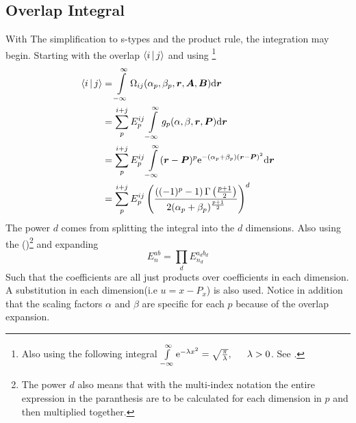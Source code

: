 \subsection{Overlap Integral\label{susec:overlapIntegral}}
    With The simplification to s-types and the product rule, the integration
    may begin. Starting with the overlap $\Braket{i|j}$ and using
    \footnote{Also using the following integral $\infint
    \me^{-\lambda x^2} = \sqrt{\frac{\pi}{\lambda}},\indent \lambda>0$. See
    \cite{handbookmath}.}
        \begin{align}
            \Braket{i|j} &= \int\limits^{\infty}_{-\infty}
            \Omega_{ij}(\alpha_p,\beta_p,\boldsymbol{{r}},\boldsymbol{{A}},\boldsymbol{{B}}) \mathrm{d}
            \boldsymbol{{r}} \nonumber \\
            &= \sum\limits^{i+j}_{p} E^{ij}_{p} \int\limits^{\infty}_{-\infty} g_p(\alpha,\beta,\boldsymbol{{r}},\boldsymbol{{P}})
            \mathrm{d}\boldsymbol{{r}} \nonumber \\
            &= \sum\limits^{i+j}_{p} E^{ij}_{p} \int\limits^{\infty}_{-\infty} (\boldsymbol{{r}}-\boldsymbol{{P}})^p \mathrm{e}^{-(\alpha_p +
            \beta_p)(\boldsymbol{{r}} - \boldsymbol{{P}})^2} \mathrm{d}\boldsymbol{{r}} \nonumber \\
            &= \sum\limits^{i+j}_{p} E^{ij}_{p}
            \left(\frac{\left((-1)^p-1\right)\Gamma\left(\frac{p+1}{2}\right)}
            {2(\alpha_p+\beta_p)^{\frac{p+1}{2}}}\right)^d
            \label{eq:stypeOverlap}
        \end{align}
    The power $d$ comes from splitting the integral into the $d$ dimensions.
    Also using the ()\footnote{The power $d$ also means
    that with the multi-index notation the entire expression in the paranthesis
    are to be calculated for each dimension in $p$ and then multiplied
    together.} and expanding
        \begin{equation}
            E^{ab}_{n} = \prod_d E^{a_db_d}_{n_d}
            \label{eq:Enotation}
        \end{equation}
    Such that the coefficients are all just products over coefficients in each
    dimension. A substitution in each dimension(i.e $u=x-P_x$) is also used.
    Notice in addition that the scaling factors $\alpha$ and $\beta$ are
    specific for each $p$ because of the overlap expansion.


